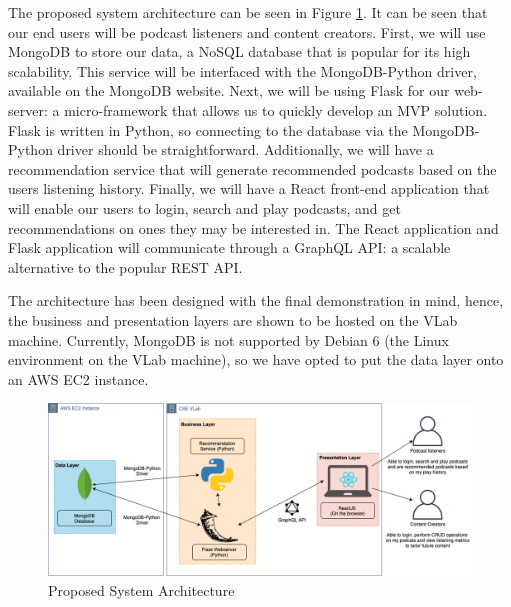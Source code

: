 \documentclass[12pt]{article}
\begin{document}
The proposed system architecture can be seen in Figure \ref{fig:SysArch}.
It can be seen that our end users will be podcast listeners and content creators.
First, we will use MongoDB\cite{MongoDB2020} to store our data, a NoSQL database that is popular for its high scalability.
This service will be interfaced with the MongoDB-Python driver, available on the MongoDB website\cite{MongoDB2020}.
Next, we will be using Flask\cite{flask} for our web-server: a micro-framework that allows us to quickly develop an MVP solution.
Flask is written in Python, so connecting to the database via the MongoDB-Python driver should be straightforward.
Additionally, we will have a recommendation service that will generate recommended podcasts based on the users listening history.
Finally, we will have a React\cite{react} front-end application that will enable our users to login, search and play podcasts, and get recommendations on ones they may be interested in.
The React application and Flask application will communicate through a GraphQL API: a scalable alternative to the popular REST API\cite{graphql}.

The architecture has been designed with the final demonstration in mind, hence, the business and presentation layers are shown to be hosted on the VLab machine.
Currently, MongoDB is not supported by Debian 6 (the Linux environment on the VLab machine), so we have opted to put the data layer onto an AWS EC2 instance\cite{aws_ec2}.

\begin{figure}
    \centering
    \includegraphics[width=\textwidth]{resources/SystemArchitecture}
    \caption{Proposed System Architecture}
    \label{fig:SysArch}
\end{figure}

\newpage


\end{document}
